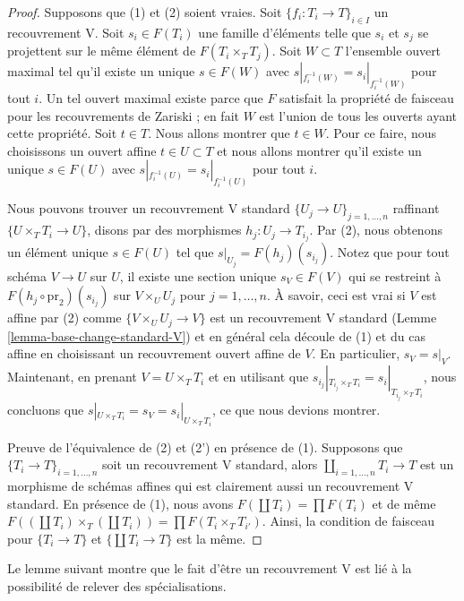 \begin{proof}
Supposons que (1) et (2) soient vraies. Soit $\{f_i : T_i \to T\}_{i \in I}$ un recouvrement V. Soit $s_i \in F(T_i)$ une famille d’éléments telle que $s_i$ et $s_j$ se projettent sur le même élément de $F(T_i \times_T T_j)$. Soit $W \subset T$ l’ensemble ouvert maximal tel qu’il existe un unique $s \in F(W)$ avec $s|_{f_i^{-1}(W)} = s_i|_{f_i^{-1}(W)}$ pour tout $i$. Un tel ouvert maximal existe parce que $F$ satisfait la propriété de faisceau pour les recouvrements de Zariski ; en fait $W$ est l'union de tous les ouverts ayant cette propriété. Soit $t \in T$. Nous allons montrer que $t \in W$. Pour ce faire, nous choisissons un ouvert affine $t \in U \subset T$ et nous allons montrer qu'il existe un unique $s \in F(U)$ avec $s|_{f_i^{-1}(U)} = s_i|_{f_i^{-1}(U)}$ pour tout $i$.

\medskip\noindent
Nous pouvons trouver un recouvrement V standard $\{U_j \to U\}_{j = 1, \ldots, n}$ raffinant $\{U \times_T T_i \to U\}$, disons par des morphismes $h_j : U_j \to T_{i_j}$. Par (2), nous obtenons un élément unique $s \in F(U)$ tel que $s|_{U_j} = F(h_j)(s_{i_j})$. Notez que pour tout schéma $V \to U$ sur $U$, il existe une section unique $s_V \in F(V)$ qui se restreint à $F(h_j \circ \text{pr}_2)(s_{i_j})$ sur $V \times_U U_j$ pour $j = 1, \ldots, n$. À savoir, ceci est vrai si $V$ est affine par (2) comme $\{V \times_U U_j \to V\}$ est un recouvrement V standard (Lemme \ref{lemma-base-change-standard-V}) et en général cela découle de (1) et du cas affine en choisissant un recouvrement ouvert affine de $V$. En particulier, $s_V = s|_V$. Maintenant, en prenant $V = U \times_T T_i$ et en utilisant que $s_{i_j}|_{T_{i_j} \times_T T_i} = s_i|_{T_{i_j} \times_T T_i}$, nous concluons que $s|_{U \times_T T_i} = s_V = s_i|_{U \times_T T_i}$, ce que nous devions montrer.

\medskip\noindent
Preuve de l'équivalence de (2) et (2') en présence de (1). Supposons que $\{T_i \to T\}_{i = 1, \ldots, n}$ soit un recouvrement V standard, alors $\coprod_{i = 1, \ldots, n} T_i \to T$ est un morphisme de schémas affines qui est clairement aussi un recouvrement V standard. En présence de (1), nous avons $F(\coprod T_i) = \prod F(T_i)$ et de même $F((\coprod T_i) \times_T (\coprod T_i)) = \prod F(T_i \times_T T_{i'})$. Ainsi, la condition de faisceau pour $\{T_i \to T\}$ et $\{\coprod T_i \to T\}$ est la même.
\end{proof}


\noindent
Le lemme suivant montre que le fait d'être un recouvrement V est lié à la possibilité de relever des spécialisations.

